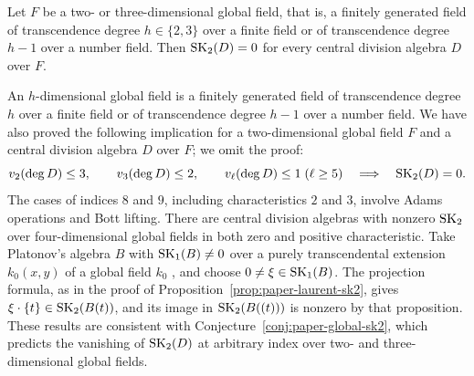 \begin{conjecture}\label{conj:paper-global-sk2}
Let $F$ be a two- or three-dimensional global field, that is, a finitely generated field of transcendence degree $h\in\{2,3\}$ over a finite field or of transcendence degree $h-1$ over a number field.
Then $\operatorname{SK}_2(D)=0$ for every central division algebra $D$ over $F$.
\end{conjecture}

\begin{remark}
An $h$-dimensional global field is a finitely generated field of transcendence degree $h$ over a finite field or of transcendence degree $h-1$ over a number field.
We have also proved the following implication for a two-dimensional global field $F$ and a central division algebra $D$ over $F$; we omit the proof:
\[
v_2(\deg D)\le3,\qquad v_3(\deg D)\le2,\qquad
v_\ell(\deg D)\le1\;(\ell\ge5)
\quad\Longrightarrow\quad\operatorname{SK}_2(D)=0.
\]
The cases of indices $8$ and $9$, including characteristics $2$ and $3$, involve Adams operations and Bott lifting.
There are central division algebras with nonzero $\operatorname{SK}_2$ over four-dimensional global fields in both zero and positive characteristic.
Take Platonov's algebra $B$ with $\operatorname{SK}_1(B)\ne0$ over a purely transcendental extension $k_0(x,y)$ of a global field $k_0$ \cite[Theorem 6.2]{Platonov1976}, and choose $0\ne\xi\in\operatorname{SK}_1(B)$.
The projection formula, as in the proof of Proposition~\ref{prop:paper-laurent-sk2}, gives $\xi\cdot\{t\}\in\operatorname{SK}_2(B(t))$, and its image in $\operatorname{SK}_2(B((t)))$ is nonzero by that proposition.
These results are consistent with Conjecture~\ref{conj:paper-global-sk2}, which predicts the vanishing of $\operatorname{SK}_2(D)$ at arbitrary index over two- and three-dimensional global fields.
\end{remark}
